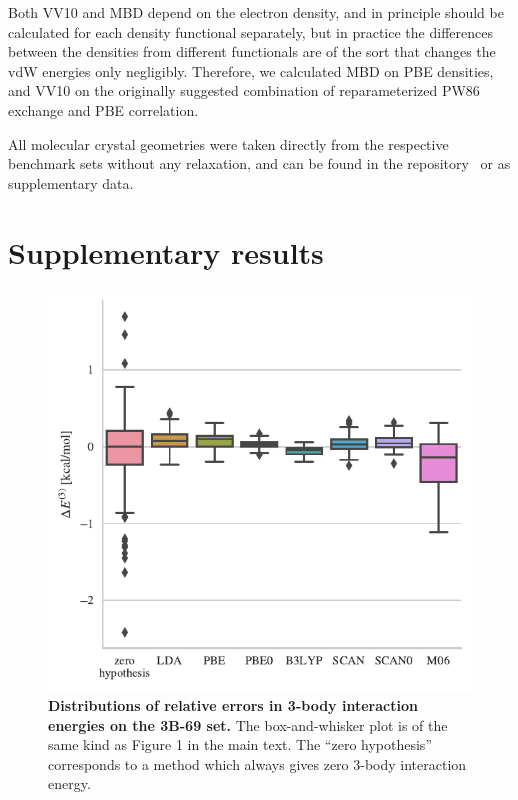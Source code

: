 \documentclass[twocolumn]{article}
\begin{document}
Both VV10 and MBD depend on the electron density, and in principle should be calculated for each density functional separately, but in practice the differences between the densities from different functionals are of the sort that changes the vdW energies only negligibly.
Therefore, we calculated MBD on PBE densities, and VV10 on the originally suggested combination of reparameterized PW86 exchange and PBE correlation.

All molecular crystal geometries were taken directly from the respective benchmark sets without any relaxation, and can be found in the repository~\cite{GitRepo} or as supplementary data.

\section{Supplementary results}

\begin{figure}
\includegraphics[center]{../media/3-body}

\caption{\textbf{Distributions of relative errors in 3-body interaction energies on the 3B-69 set.}
The box-and-whisker plot is of the same kind as Figure 1 in the main text.
The ``zero hypothesis'' corresponds to a method which always gives zero 3-body interaction energy.
}\label{fig:3-body}
\end{figure}
\end{document}

